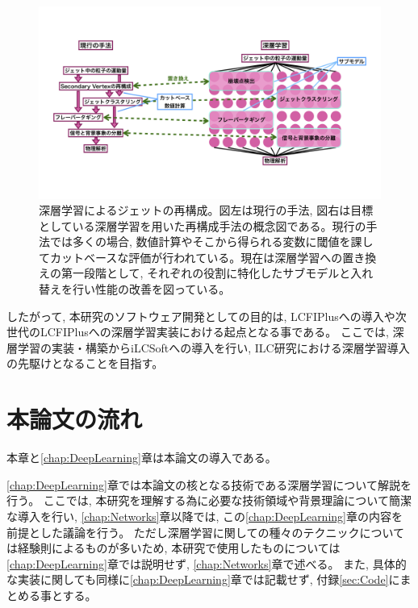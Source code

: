 \begin{figure}[htbp]
 \centering
 \includegraphics[trim = 0 100 0 50, width=1.0\textwidth, clip]{Figure/1Introduction/7JetReconstructionwithDeepLearning.png}
 \caption[深層学習によるジェットの再構成]{深層学習によるジェットの再構成。図左は現行の手法, 図右は目標としている深層学習を用いた再構成手法の概念図である。現行の手法では多くの場合, 数値計算やそこから得られる変数に閾値を課してカットベースな評価が行われている。現在は深層学習への置き換えの第一段階として, それぞれの役割に特化したサブモデルと入れ替えを行い性能の改善を図っている。}
 \label{7JetReconstructionwithDeepLearning}
\end{figure}

したがって, 本研究のソフトウェア開発としての目的は, LCFIPlusへの導入や次世代のLCFIPlusへの深層学習実装における起点となる事である。
ここでは, 深層学習の実装・構築からiLCSoftへの導入を行い, ILC研究における深層学習導入の先駆けとなることを目指す。


\section{本論文の流れ} \label{Intro:Flow}

本章と\ref{chap:DeepLearning}章は本論文の導入である。

\ref{chap:DeepLearning}章では本論文の核となる技術である深層学習について解説を行う。
ここでは, 本研究を理解する為に必要な技術領域や背景理論について簡潔な導入を行い, \ref{chap:Networks}章以降では, この\ref{chap:DeepLearning}章の内容を前提とした議論を行う。
ただし深層学習に関しての種々のテクニックについては経験則によるものが多いため, 本研究で使用したものについては\ref{chap:DeepLearning}章では説明せず, \ref{chap:Networks}章で述べる。
また, 具体的な実装に関しても同様に\ref{chap:DeepLearning}章では記載せず, 付録\ref{sec:Code}にまとめる事とする。\\

